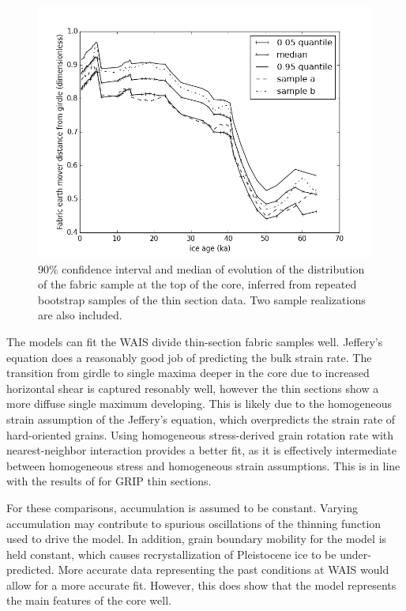\documentclass{igs}
\begin{document}
\begin{figure}
\caption{90\% confidence interval and median of evolution of the distribution of the fabric sample at the top of the core, inferred from repeated bootstrap samples of the thin section data. Two sample realizations are also included.}
\includegraphics[width=12cm]{ci}
\end{figure}
The models can fit the WAIS divide thin-section fabric samples well. Jeffery's equation does a reasonably good job of predicting the bulk strain rate.  The transition from girdle to single maxima deeper in the core due to increased horizontal shear is captured resonably well, however the thin sections show a more diffuse single maximum developing. This is likely due to the homogeneous strain assumption of the Jeffery's equation, which overpredicts the strain rate of hard-oriented grains. Using homogeneous stress-derived grain rotation rate with nearest-neighbor interaction provides a better fit, as it is effectively intermediate between homogeneous stress and homogeneous strain assumptions. This is in line with the results of \citet{thorsteinsson2002nni} for GRIP thin sections.

For these comparisons, accumulation is assumed to be constant. Varying accumulation may contribute to spurious oscillations of the thinning function used to drive the model. In addition, grain boundary mobility for the model is held constant, which causes recrystallization of Pleistocene ice to be under-predicted. More accurate data representing the past conditions at WAIS would allow for a more accurate fit. However, this does show that the model represents the main features of the core well. 
\end{document}
